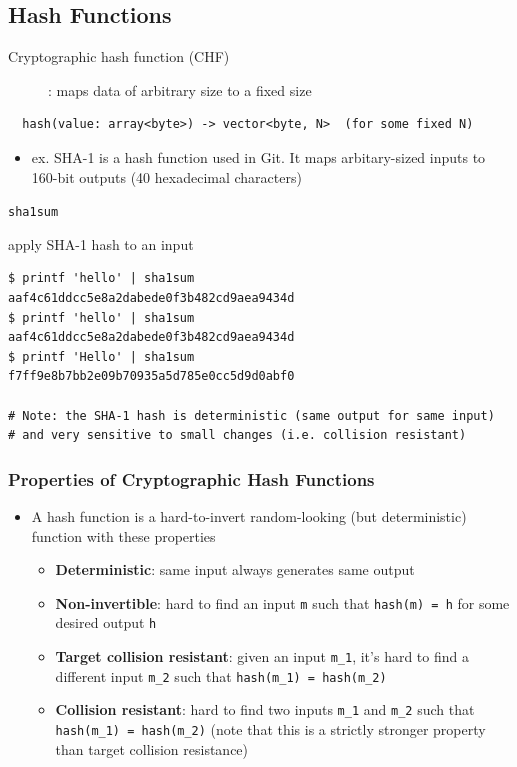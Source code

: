 \documentclass[letterpaper,12pt]{article}
\newcommand*{\lstitem}[1]{
  \setbox0\hbox{\lstinline{#1}}
  \item[\usebox0]
}
\begin{document}
\subsection{Hash Functions}
\begin{description}
 \item[Cryptographic hash function (CHF)]: maps data of arbitrary size to a fixed size
\end{description}

\begin{lstlisting}
  hash(value: array<byte>) -> vector<byte, N>  (for some fixed N)
\end{lstlisting}


\begin{itemize}
 \item ex. SHA-1 is a hash function used in Git. It maps arbitary-sized inputs to 160-bit outputs (40 hexadecimal characters)
\end{itemize}

\begin{description}
 \lstitem{sha1sum} apply SHA-1 hash to an input
\end{description}

\begin{lstlisting}
$ printf 'hello' | sha1sum
aaf4c61ddcc5e8a2dabede0f3b482cd9aea9434d
$ printf 'hello' | sha1sum
aaf4c61ddcc5e8a2dabede0f3b482cd9aea9434d
$ printf 'Hello' | sha1sum
f7ff9e8b7bb2e09b70935a5d785e0cc5d9d0abf0

# Note: the SHA-1 hash is deterministic (same output for same input)
# and very sensitive to small changes (i.e. collision resistant)
\end{lstlisting}

\subsubsection{Properties of Cryptographic Hash Functions}
\begin{itemize}
 \item A hash function is a hard-to-invert random-looking (but deterministic) function with these properties
       \begin{itemize}
        \item \textbf{Deterministic}: same input always generates same output
        \item \textbf{Non-invertible}: hard to find an input \lstinline{m} such that \lstinline{hash(m) = h} for some desired output \lstinline{h}
        \item \textbf{Target collision resistant}: given an input \lstinline{m_1}, it’s hard to find a different input \lstinline{m_2} such that \lstinline{hash(m_1) = hash(m_2)}
        \item \textbf{Collision resistant}: hard to find two inputs \lstinline{m_1} and \lstinline{m_2} such that \lstinline{hash(m_1) = hash(m_2)} (note that this is a strictly stronger property than target collision resistance)
       \end{itemize}
\end{itemize}
\end{document}
